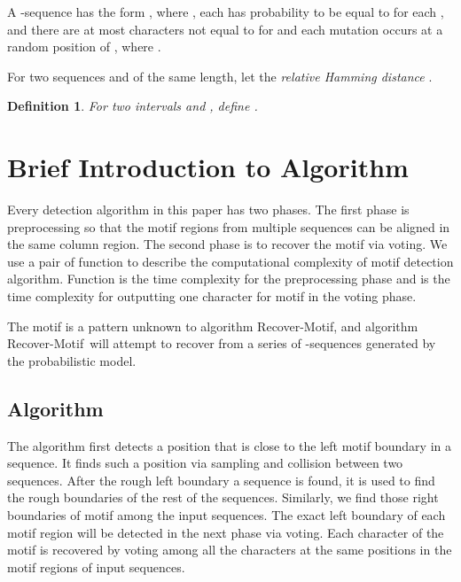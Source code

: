 \documentclass[11pt]{article}
\newtheorem{dfntn}[theoremfoo]{Definition}
\newenvironment{definition}{\pagebreak[1]\begin{dfntn}\rm}{\end{dfntn}}
\newcommand{\algmnam}{Recover-Motif}
\begin{document}
A -sequence has the form , where , each  has
probability  to be equal to  for each
, and there are at most  characters  not
equal to  for  and each mutation occurs at a
random position of , where .






For two sequences  and  of the
same length, let the {\it relative Hamming distance} .


\begin{definition}\label{shift-def}
For two intervals  and , define
.
\end{definition}







\section{Brief Introduction to Algorithm}

Every detection algorithm in this paper has two phases. The first
phase is preprocessing so that the motif regions from multiple
sequences can be aligned in the same column region. The second phase
is to recover the motif via voting. We use a pair of function
 to describe the computational complexity of
motif detection algorithm. Function  is the time
complexity for the preprocessing phase and  is the time
complexity for outputting one character for motif in the voting
phase.




The motif  is a pattern unknown to algorithm \algmnam, and
algorithm \algmnam~will attempt to recover  from a series of
-sequences generated by the probabilistic model.



\subsection{Algorithm}

The algorithm first detects a position that is close to the left
motif boundary in a sequence. It finds such a position via sampling
and collision between two sequences. After the rough left boundary a
sequence is found, it is used to find the rough boundaries of the
rest of the sequences. Similarly, we find those right boundaries of
motif among the input sequences. The exact left boundary of each
motif region will be detected in the next phase via voting. Each
character of the motif is recovered by voting among all the
characters at the same positions in the motif regions of input
sequences.
\end{document}

